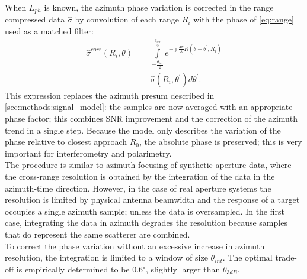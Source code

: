 When $L_{ph}$ is known, the azimuth phase variation is corrected in the range compressed data $\hat{\sigma}$ by convolution of each range $R_{i}$ with the phase of \eqref{eq:range} used as a matched filter:
\begin{equation}\label{eq:correction}
	\begin{aligned}
		\hat{\sigma}^{corr}\left(R_{i}, \theta\right) = &\int\limits_{-\frac{\theta_{int}}{2}}^{\frac{\theta_{int}}{2}}e^{-\jmath \frac{4\pi}{\lambda}R\left(\theta - \theta^{\prime}, R_{i}\right)}\\
		&\hat{\sigma}\left(R_{i}, \theta^\prime\right) d\theta^\prime.
	\end{aligned}
\end{equation}
This expression replaces the azimuth presum described in \autoref{sec:methods:signal_model}: the samples are now averaged with an appropriate phase factor; this combines SNR improvement and the correction of the azimuth trend in a single step. Because the model only describes the variation of the phase relative to closest approach $R_{0}$, the absolute phase is preserved; this is very important for interferometry and polarimetry.\\
The procedure is similar to azimuth focusing of synthetic aperture data, where the cross-range resolution is obtained by the integration of the data in the azimuth-time direction. However, in the case of real aperture systems the resolution is limited by physical antenna beamwidth and the response of a target  occupies a single azimuth sample; unless the data is oversampled. In the first case, integrating the data in azimuth degrades the resolution because samples that do represent the same scatterer are combined.\\ To correct the phase variation without an excessive increase in azimuth resolution, the integration is limited to a window of size $\theta_{int}$. The optimal trade-off is empirically determined to be 0.6$^\circ$, slightly larger than $\theta_{3dB}$.
